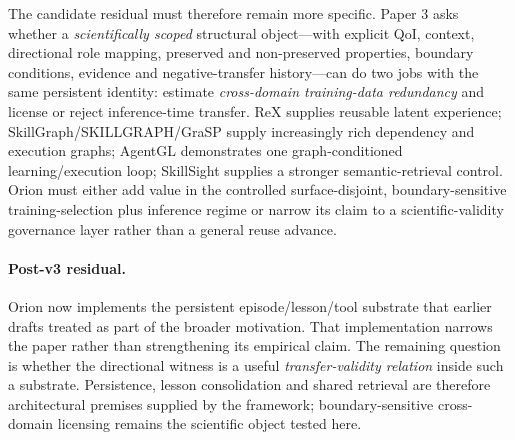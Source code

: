 The candidate residual must therefore remain more specific. Paper 3 asks whether a \emph{scientifically scoped} structural object---with explicit QoI, context, directional role mapping, preserved and non-preserved properties, boundary conditions, evidence and negative-transfer history---can do two jobs with the same persistent identity: estimate \emph{cross-domain training-data redundancy} and license or reject inference-time transfer. ReX supplies reusable latent experience; SkillGraph/SKILLGRAPH/GraSP supply increasingly rich dependency and execution graphs; AgentGL demonstrates one graph-conditioned learning/execution loop; SkillSight supplies a stronger semantic-retrieval control. Orion must either add value in the controlled surface-disjoint, boundary-sensitive training-selection plus inference regime or narrow its claim to a scientific-validity governance layer rather than a general reuse advance.


\paragraph{Post-v3 residual.}
Orion now implements the persistent episode/lesson/tool substrate that earlier drafts treated as part of the broader motivation. That implementation narrows the paper rather than strengthening its empirical claim. The remaining question is whether the directional witness is a useful \emph{transfer-validity relation} inside such a substrate. Persistence, lesson consolidation and shared retrieval are therefore architectural premises supplied by the framework; boundary-sensitive cross-domain licensing remains the scientific object tested here.
